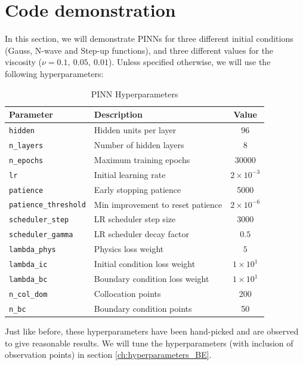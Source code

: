 \documentclass[we,twoside,openright,a4paper,11pt]{uantwerpenbamathesis}
\begin{document}
\section{Code demonstration}
In this section, we will demonstrate PINNs for three different initial conditions (Gauss, N-wave and Step-up functions), and three different values for the viscosity ($\nu=0.1,\ 0.05,\ 0.01$). Unless specified otherwise, we will use the following hyperparameters:

\begin{table}[H]
\centering
\caption{PINN Hyperparameters}\label{tab:standard_parameters_BE}
\begin{tabular}{llc}
\toprule
\textbf{Parameter} & \textbf{Description} & \textbf{Value} \\
\midrule
\texttt{hidden}               & Hidden units per layer            & 96                   \\
\texttt{n\_layers}            & Number of hidden layers           & 8                    \\
\texttt{n\_epochs}            & Maximum training epochs           & 30000                \\
\texttt{lr}                   & Initial learning rate             & $2\times10^{-3}$     \\
\texttt{patience}             & Early stopping patience           & 5000                 \\
\texttt{patience\_threshold}  & Min improvement to reset patience & $2\times10^{-6}$     \\
\texttt{scheduler\_step}      & LR scheduler step size            & 3000                 \\
\texttt{scheduler\_gamma}     & LR scheduler decay factor         & $0.5$                \\
\texttt{lambda\_phys}         & Physics loss weight               & $5$                  \\
\texttt{lambda\_ic}           & Initial condition loss weight     & $1\times10^{1}$      \\
\texttt{lambda\_bc}           & Boundary condition loss weight    & $1\times10^{1}$      \\
\texttt{n\_col\_dom}          & Collocation points                & 200                  \\
\texttt{n\_bc}                & Boundary condition points         & 50                   \\
\bottomrule
\end{tabular}
\end{table}
Just like before, these hyperparameters have been hand-picked and are observed to give reasonable results. We will tune the hyperparameters (with inclusion of observation points) in section \ref{ch:hyperparameters_BE}.
\end{document}

